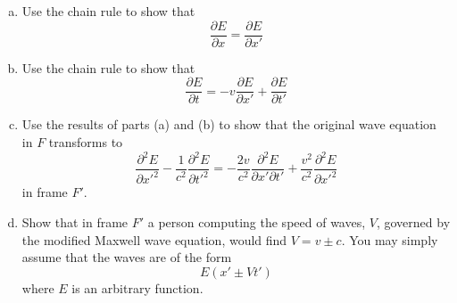 \documentclass[solutions]{esg8022pset}
\begin{document}
  \begin{enumerate}[(a)]
    \item Use the chain rule to show that
      $$\frac{\partial E}{\partial x} = \frac{\partial E}{\partial x'}$$
    \item Use the chain rule to show that
      $$\frac{\partial E}{\partial t} = -v \frac{\partial E}{\partial x'} + \frac{\partial E}{\partial t'}$$
    \item Use the results of parts (a) and (b) to show that the original wave equation in $F$ transforms to
      $$\frac{\partial^2E}{\partial x'^2} - \frac{1}{c^2} \frac{\partial^2E}{\partial t'^2} = -\frac{2v}{c^2} \frac{\partial^2E}{\partial x' \partial t'} + \frac{v^2}{c^2} \frac{\partial^2E}{\partial x'^2}$$
      in frame $F'$.
    \item Show that in frame $F'$ a person computing the speed of waves, $V$, governed by the modified Maxwell wave equation, would find $V = v \pm c$.  You may simply assume that the waves are of the form
      $$E(x' \pm Vt')$$
      where $E$ is an arbitrary function.
  \end{enumerate}
\end{document}
